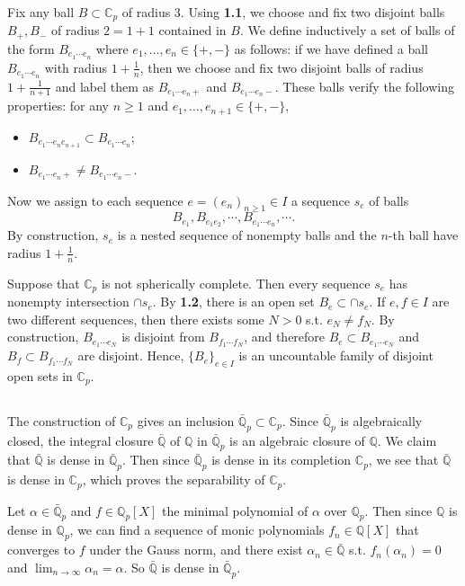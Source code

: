 \documentclass{article}
\theoremstyle{definition}
\theoremstyle{remark}
\newcommand{\C}{\mathbb{C}}
\newcommand{\Q}{\mathbb{Q}}
\begin{document}
Fix any ball $B\subset\C_p$ of radius $3$.
Using \textbf{1.1}, we choose and fix two disjoint balls $B_+, B_-$ of radius $2 = 1 + 1$
contained in $B$. We define inductively a set of balls of the form $B_{e_1\cdots e_n}$ where $e_1, \dots, e_n\in\{+, -\}$ as follows: if we have defined a ball $B_{e_1\cdots e_n}$ with radius $1 + \frac{1}{n}$, then we choose and fix two disjoint balls of radius $1 + \frac{1}{n+1}$
and label them as $B_{e_1\cdots e_n +}$ and $B_{e_1\cdots e_n-}$. These balls verify the following properties: for any $n\ge 1$ and $e_1, \dots, e_{n+1}\in\{+, -\}$,\begin{itemize}
    \item $B_{e_1\cdots e_ne_{n+1}}\subset B_{e_1\cdots e_n}$;
    \item $B_{e_1\cdots e_n+}\neq B_{e_1\cdots e_n-}$.
\end{itemize}

Now we assign to each sequence $e = (e_n)_{n\ge 1}\in I$
a sequence $s_e$ of balls \[B_{e_1}, B_{e_1e_2}, \cdots, B_{e_1\cdots e_n}, \cdots.\]
By construction, $s_e$ is a nested sequence of nonempty balls and the $n$-th ball have radius $1 + \frac{1}{n}$.

Suppose that $\C_p$ is not spherically complete.
Then every sequence $s_e$ has nonempty intersection $\cap s_e$.
By \textbf{1.2}, there is an open set $B_e\subset\cap s_e$.
If $e,f\in I$ are two different sequences,
then there exists some $N > 0$ s.t. $e_N\ne f_N$.
By construction, $B_{e_1\cdots e_N}$ is disjoint from $B_{f_1\cdots f_N}$, and therefore $B_e\subset B_{e_1\cdots e_N}$ and $B_f\subset B_{f_1\cdots f_N}$ are disjoint.
Hence, $\{B_e\}_{e\in I}$ is an uncountable family of disjoint open sets in $\C_p$.


\subsection{}
The construction of $\C_p$ gives an inclusion $\bar{\Q}_p\subset\C_p$.
Since $\bar{\Q}_p$ is algebraically closed, the integral closure $\bar{\Q}$ of $\Q$ in $\bar{\Q}_p$ is an algebraic closure of $\Q$.
We claim that $\bar{\Q}$ is dense in $\bar{\Q}_p$.
Then since $\bar{\Q}_p$ is dense in its completion $\C_p$,
we see that $\bar{\Q}$ is dense in $\C_p$,
which proves the separability of $\C_p$.

Let $\alpha\in\bar{\Q}_p$ and $f\in \Q_p[X]$ the minimal polynomial of $\alpha$ over $\Q_p$.
Then since $\Q$ is dense in $\Q_p$, we can find a sequence of monic polynomials $f_n\in \Q[X]$ that converges to $f$ under the Gauss norm,
and there exist $\alpha_n\in\bar{\Q}$ s.t. $f_n(\alpha_n) = 0$ and $\lim_{n\to\infty}\alpha_n = \alpha$. So $\bar{\Q}$ is dense in $\bar{\Q}_p$.
\end{document}

